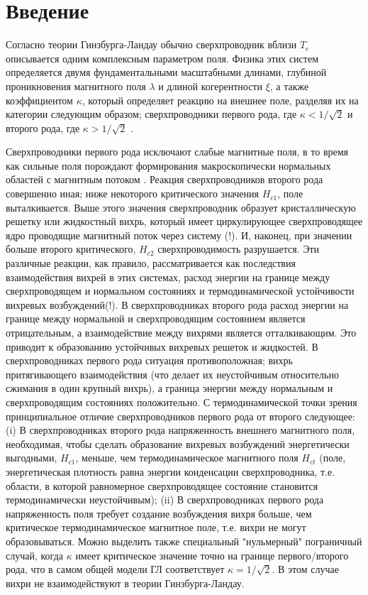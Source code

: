 \chapter{Введение}
\label{ch:1}

Согласно теории Гинзбурга-Ландау обычно сверхпроводник вблизи \( T_c \) 
описывается одним комплексным параметром поля. Физика этих систем определяется 
двумя фундаментальными масштабными длинами, глубиной проникновения магнитного 
поля \( \lambda \) и длиной когерентности \( \xi \), а также коэффициентом 
\( \kappa \), который определяет реакцию на внешнее поле, разделяя их на 
категории следующим образом; сверхпроводники первого рода, где 
\( \kappa < 1/\sqrt{2} \) и второго рода, где \( \kappa > 1/\sqrt{2} \) 
\cite{bib:3}.

Сверхпроводники первого рода исключают слабые магнитные поля, в то время как 
сильные поля порождают формирования макроскопически нормальных областей с 
магнитным потоком \cite{bib:4}. Реакция сверхпроводников второго рода 
совершенно иная; ниже некоторого критического значения \( H_{c1} \), поле 
выталкивается. Выше этого значения сверхпроводник образует кристаллическую 
решетку или жидкостный вихрь, который имеет циркулирующее сверхпроводящее 
ядро проводящие магнитный поток через систему (!). И, наконец, при значении 
больше второго критического, \( H_{c2} \) сверхпроводимость разрушается. Эти 
различные реакции, как правило, рассматривается как последствия взаимодействия 
вихрей в этих системах, расход энергии на границе между сверхпроводящем и 
нормальном состояниях и термодинамической устойчивости вихревых возбуждений(!). 
В сверхпроводниках второго рода расход энергии на границе между нормальной и 
сверхпроводящим состоянием является отрицательным, а взаимодействие между 
вихрями является отталкивающим\cite{bib:3}. Это приводит к образованию 
устойчивых вихревых решеток и жидкостей. В сверхпроводниках первого рода 
ситуация противоположная; вихрь притягивающего взаимодействия (что делает их 
неустойчивым относительно сжимания в один крупный вихрь), а граница энергии 
между нормальным и сверхпроводящим состояниях положительно. С термодинамической 
точки зрения принципиальное отличие сверхпроводников первого рода от второго 
следующее: (i) В сверхпроводниках второго рода напряженность внешнего 
магнитного поля, необходимая, чтобы сделать образование вихревых возбуждений 
энергетически выгодными, \( H_{c1} \), меньше, чем термодинамическое 
магнитного поля \( H_{ct} \) (поле, энергетическая плотность равна энергии 
конденсации сверхпроводника, т.е. области, в которой равномерное 
сверхпроводящее состояние становится термодинамически неустойчивым); (ii) В 
сверхпроводниках первого рода напряженность поля требует создание возбуждения 
вихря больше, чем критическое термодинамическое магнитное поле, т.е. вихри не
могут образовываться. Можно выделить также специальный "нульмерный" 
пограничный случай, когда \( \kappa \) имеет критическое значение точно на 
границе первого/второго рода, что в самом общей модели ГЛ соответствует 
\( \kappa = 1/\sqrt{2} \). В этом случае вихри не взаимодействуют\cite{bib:5} 
в теории Гинзбурга-Ландау.

